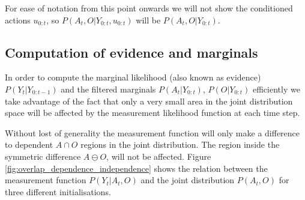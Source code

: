 For ease of notation from this point onwards we will not show the conditioned actions $u_{0:t}$, so $P(A_t,O|Y_{0:t},u_{0:t})$ will 
be $P(A_t,O|Y_{0:t})$. 

\subsection{Computation of evidence and marginals}

In order to compute the marginal likelihood (also known as evidence) $P(Y_t|Y_{0:t-1})$ and the filtered  marginals $P(A_t|Y_{0:t})$,
$P(O|Y_{0:t})$ efficiently we take advantage of the fact that only a very small area 
in the joint distribution space will be affected by the measurement likelihood function at each time step.

Without lost of generality the measurement function will only make a difference to dependent $A \cap O$ regions in the joint distribution. 
The region inside the symmetric difference $A \ominus O$, will not be affected.
Figure \ref{fig:overlap_dependence_independence} shows the relation between the measurement 
function $P(Y_t|A_t,O)$ and the joint distribution $P(A_t,O)$ for three different initialisations. 

